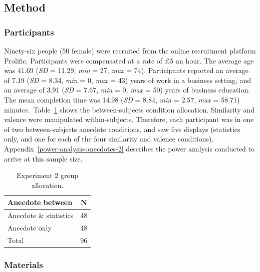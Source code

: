 \documentclass[a4paper, nobind, dvipsnames]{templates/ociamthesis}
\theoremstyle{definition}
\theoremstyle{definition}
\theoremstyle{definition}
\theoremstyle{definition}
\theoremstyle{remark}
\begin{document}
\subsection{Method}

\subsubsection{Participants}

Ninety-six people (50 female) were recruited from the online recruitment platform Prolific. Participants were compensated at a rate of £5 an hour. The average age was 41.69 (\emph{SD} = 11.29, \emph{min} = 27, \emph{max} = 74). Participants reported an average of 7.19 (\emph{SD} = 8.34, \emph{min} = 0, \emph{max} = 43) years of work in a business setting, and an average of 3.91 (\emph{SD} = 7.67, \emph{min} = 0, \emph{max} = 50) years of business education. The mean completion time was 14.98 (\emph{SD} = 8.84, \emph{min} = 2.57, \emph{max} = 58.71) minutes.~Table~\ref{tab:condition-allocation-anecdotes-2}
shows the between-subjects condition allocation. Similarity and valence were
manipulated within-subjects. Therefore, each participant was in one of two
between-subjects anecdote conditions, and saw five displays (statistics only,
and one for each of the four similarity and valence conditions).
Appendix~\ref{power-analysis-anecdotes-2} describes the power analysis
conducted to arrive at this sample size.

\begin{table}[tbp]

\begin{center}
\begin{threeparttable}

\caption{\label{tab:condition-allocation-anecdotes-2}Experiment 2 group allocation.}

\begin{tabular}{ll}
\toprule
Anecdote between & \multicolumn{1}{c}{N}\\
\midrule
Anecdote \& statistics & 48\\
Anecdote only & 48\\
Total & 96\\
\bottomrule
\end{tabular}

\end{threeparttable}
\end{center}

\end{table}

\subsubsection{Materials}
\end{document}
